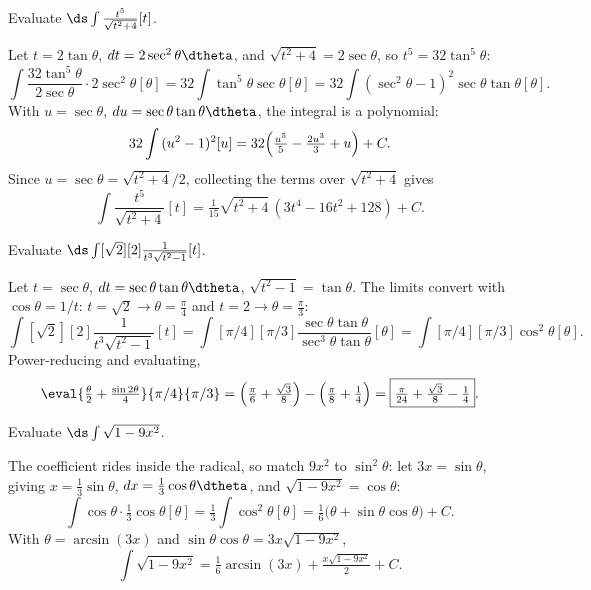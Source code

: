 \begin{exercise}
	Evaluate $\ds \int{\frac{t^5}{\sqrt{t^2 + 4}}}[t]$.
\end{exercise}
\begin{solution}[3in]
	Let $t = 2\tan\theta$, $dt = 2\sec^2\theta\dtheta$, and
	$\sqrt{t^2 + 4} = 2\sec\theta$, so $t^5 = 32\tan^5\theta$:
	\[
		\int{\frac{32\tan^5\theta}{2\sec\theta} \cdot 2\sec^2\theta}[\theta]
		   = 32\int{\tan^5\theta\sec\theta}[\theta]
		   = 32\int{(\sec^2\theta - 1)^2\sec\theta\tan\theta}[\theta].
	\]
	With $u = \sec\theta$, $du = \sec\theta\tan\theta\dtheta$, the integral is a
	polynomial:
	\[
		32\int{(u^2 - 1)^2}[u]
		   = 32\Bigl(\tfrac{u^5}{5} - \tfrac{2u^3}{3} + u\Bigr) + C.
	\]
	Since $u = \sec\theta = \sqrt{t^2 + 4}/2$, collecting the terms over
	$\sqrt{t^2 + 4}$ gives
	\[
		\int{\frac{t^5}{\sqrt{t^2 + 4}}}[t]
		   = \boxed{\tfrac{1}{15}\sqrt{t^2 + 4}\,(3t^4 - 16t^2 + 128) + C}.
	\]
\end{solution}

\begin{exercise}
	Evaluate $\ds \int[\sqrt2][2]{\frac{1}{t^3\sqrt{t^2 - 1}}}[t]$.
\end{exercise}
\begin{solution}[2.75in]
	Let $t = \sec\theta$, $dt = \sec\theta\tan\theta\dtheta$,
	$\sqrt{t^2 - 1} = \tan\theta$. The limits convert with $\cos\theta = 1/t$:
	$t = \sqrt2 \to \theta = \tfrac{\pi}{4}$ and $t = 2 \to \theta = \tfrac{\pi}{3}$:
	\[
		\int[\sqrt2][2]{\frac{1}{t^3\sqrt{t^2 - 1}}}[t]
		   = \int[\pi/4][\pi/3]{\frac{\sec\theta\tan\theta}{\sec^3\theta\tan\theta}}[\theta]
		   = \int[\pi/4][\pi/3]{\cos^2\theta}[\theta].
	\]
	Power-reducing and evaluating,
	\[
		\eval{\tfrac{\theta}{2} + \tfrac{\sin 2\theta}{4}}{\pi/4}{\pi/3}
		   = \Bigl(\tfrac{\pi}{6} + \tfrac{\sqrt3}{8}\Bigr) - \Bigl(\tfrac{\pi}{8} + \tfrac14\Bigr)
		   = \boxed{\tfrac{\pi}{24} + \tfrac{\sqrt3}{8} - \tfrac14}.
	\]
\end{solution}

\begin{exercise}
	Evaluate $\ds \int{\sqrt{1 - 9x^2}}$.
\end{exercise}
\begin{solution}[2.25in]
	The coefficient rides inside the radical, so match $9x^2$ to $\sin^2\theta$:
	let $3x = \sin\theta$, giving $x = \tfrac13\sin\theta$,
	$dx = \tfrac13\cos\theta\dtheta$, and $\sqrt{1 - 9x^2} = \cos\theta$:
	\[
		\int{\cos\theta \cdot \tfrac13\cos\theta}[\theta]
		   = \tfrac13\int{\cos^2\theta}[\theta]
		   = \tfrac16\bigl(\theta + \sin\theta\cos\theta\bigr) + C.
	\]
	With $\theta = \arcsin(3x)$ and $\sin\theta\cos\theta = 3x\sqrt{1 - 9x^2}$,
	\[
		\int{\sqrt{1 - 9x^2}}
		   = \boxed{\tfrac16\arcsin(3x) + \tfrac{x\sqrt{1 - 9x^2}}{2} + C}.
	\]
\end{solution}

